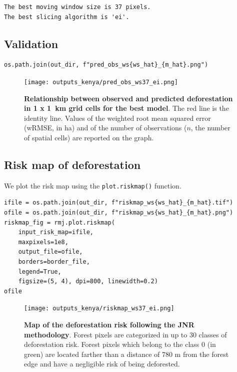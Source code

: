 \documentclass[paper=a4, 12pt, DIV=12]{scrartcl}
\begin{document}
\begin{verbatim}
The best moving window size is 37 pixels.
The best slicing algorithm is 'ei'.
\end{verbatim}

\subsection{Validation}
\label{sec:org4c61348}

\begin{verbatim}
os.path.join(out_dir, f"pred_obs_ws{ws_hat}_{m_hat}.png")
\end{verbatim}

\begin{figure}[H]
\centering
\texttt{[image: outputs\_kenya/pred\_obs\_ws37\_ei.png]}
\caption{\label{fig:orgc41b51e}\textbf{Relationship between observed and predicted deforestation in 1 x 1 km grid cells for the best model}. The red line is the identity line. Values of the weighted root mean squared error (wRMSE, in ha) and of the number of observations (\(n\), the number of spatial cells) are reported on the graph.}
\end{figure}

\subsection{Risk map of deforestation}
\label{sec:org75edb44}

We plot the risk map using the \texttt{plot.riskmap()} function.

\begin{verbatim}
ifile = os.path.join(out_dir, f"riskmap_ws{ws_hat}_{m_hat}.tif")
ofile = os.path.join(out_dir, f"riskmap_ws{ws_hat}_{m_hat}.png")
riskmap_fig = rmj.plot.riskmap(
    input_risk_map=ifile,
    maxpixels=1e8,
    output_file=ofile,
    borders=border_file,
    legend=True,
    figsize=(5, 4), dpi=800, linewidth=0.2)
ofile
\end{verbatim}

\begin{figure}[H]
\centering
\texttt{[image: outputs\_kenya/riskmap\_ws37\_ei.png]}
\caption{\label{fig:org40e755f}\textbf{Map of the deforestation risk following the JNR methodology}. Forest pixels are categorized in up to 30 classes of deforestation risk. Forest pixels which belong to the class 0 (in green) are located farther than a distance of 780 m from the forest edge and have a negligible risk of being deforested.}
\end{figure}
\end{document}
